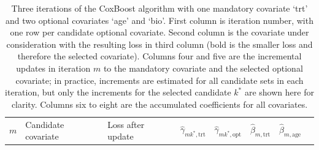 \documentclass[
  letterpaper,
  krantz2]{style/krantz}
\begin{document}
\begin{longtable}[]{@{}
  >{\raggedleft\arraybackslash}p{}
  >{\raggedright\arraybackslash}p{}
  >{\raggedleft\arraybackslash}p{}
  >{\centering\arraybackslash}p{}
  >{\raggedleft\arraybackslash}p{}
  >{\raggedleft\arraybackslash}p{}
  >{\raggedleft\arraybackslash}p{}
  >{\raggedleft\arraybackslash}p{}@{}}
\caption{Three iterations of the CoxBoost algorithm with one mandatory
covariate `trt' and two optional covariates `age' and `bio'. First
column is iteration number, with one row per candidate optional
covariate. Second column is the covariate under consideration with the
resulting loss in third column (bold is the smaller loss and therefore
the selected covariate). Columns four and five are the incremental
updates in iteration \(m\) to the mandatory covariate and the selected
optional covariate; in practice, increments are estimated for all
candidate sets in each iteration, but only the increments for the
selected candidate \(k^*\) are shown here for clarity. Columns six to
eight are the accumulated coefficients for all
covariates.}\label{tbl-coxboost}\tabularnewline
\toprule\noalign{}
\begin{minipage}[b]{\linewidth}\raggedleft
\(m\)
\end{minipage} & \begin{minipage}[b]{\linewidth}\raggedright
Candidate covariate
\end{minipage} & \begin{minipage}[b]{\linewidth}\raggedleft
Loss after update
\end{minipage} & \begin{minipage}[b]{\linewidth}\centering
\(\hat{\gamma}_{mk^*,\text{trt}}\)
\end{minipage} & \begin{minipage}[b]{\linewidth}\raggedleft
\(\hat{\gamma}_{mk^*,\text{opt}}\)
\end{minipage} & \begin{minipage}[b]{\linewidth}\raggedleft
\(\hat{\beta}_{m,\text{trt}}\)
\end{minipage} & \begin{minipage}[b]{\linewidth}\raggedleft
\(\hat{\beta}_{m,\text{age}}\)
\end{minipage} & \begin{minipage}[b]{\linewidth}\raggedleft

\end{minipage}
\end{longtable}
\end{document}
